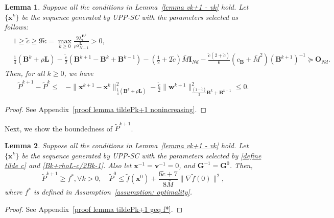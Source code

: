 \documentclass[12pt,draftcls,onecolumn]{IEEEtran}
\newtheorem{lemma}{Lemma}
\begin{document}
\begin{lemma}\label{lemma tildePk+1 nonincreasing}
	Suppose all the conditions in Lemma~\ref{lemma vk+1 - vk} hold.  Let $\{\mathbf{x}^k\}$ be the sequence generated by UPP-SC with the parameters selected as follows:
	\begin{align}
		\label{define tilde c}& 1 \geq \tilde{c}\geq 9\tilde{\kappa}=\max_{k\geq 0}\frac{9\lambda_1^{\mathbf{B}^k}}{\rho \lambda_{N-1}^{\mathbf{L}}}>0, \\
		\label{Bk+rhoL-c/2Bk-1}& \frac{1}{4}(\mathbf{B}^k+\rho \mathbf{L})-\frac{\tilde{c}}{2}(\mathbf{B}^{k+1}-\mathbf{B}^k+\mathbf{B}^{k-1})\!-\!(\frac{1}{2}+2\tilde{c})\bar{M}\mathbf{I}_{Nd}-\frac{\tilde{c}(2+\tilde{c})}{6}(c_{\mathbf{B}}+\bar{M}^2)(\mathbf{B}^{k+1})^{-1} \succeq \mathbf{O}_{Nd}.
	\end{align}
	Then, for all $k\geq 0$, we have
	\begin{align}
		\tilde{P}^{k+1}-\tilde{P}^{k}\leq& -\|\mathbf{x}^{k+1}-\mathbf{x}^k\|^2_{\frac{1}{4}(\mathbf{B}^k+\rho \mathbf{L})}-\frac{\tilde{c}}{2} \|\mathbf{w}^{k+1}\|^2_{\frac{(1-\tilde{c})}{3}\mathbf{B}^k+\mathbf{B}^{k-1}}\leq 0.  \label{tildePk+1 - tildePk lemma}
	\end{align}
\end{lemma}

\begin{proof}
	See Appendix~\ref{proof lemma tildePk+1 nonincreasing}.
\end{proof}

Next, we show the boundedness of $\tilde{P}^{k+1}$.
\begin{lemma}\label{lemma tildePk+1 geq f*}
	Suppose all the conditions in Lemma~\ref{lemma vk+1 - vk} hold. Let $\{\mathbf{x}^k\}$ be the sequence generated by UPP-SC with the parameters selected by \eqref{define tilde c} and \eqref{Bk+rhoL-c/2Bk-1}. Also let $\mathbf{x}^{-1}=\mathbf{v}^{-1}=0$, and $\mathbf{G}^{-1}=\mathbf{G}^0$. Then,
	\begin{equation*}
		\tilde{P}^{k+1}\geq f^*, \forall k >0, \quad \tilde{P}^{0}\leq \tilde{f}(\mathbf{x}^0)+\frac{6\tilde{c}+7}{8\bar{M}}\|\nabla \tilde{f}(0)\|^2,
	\end{equation*}
	where $f^*$ is defined in Assumption~\ref{assumption: optimality}.
\end{lemma}

\begin{proof}
	See Appendix~\ref{proof lemma tildePk+1 geq f*}.
\end{proof}
\end{document}
